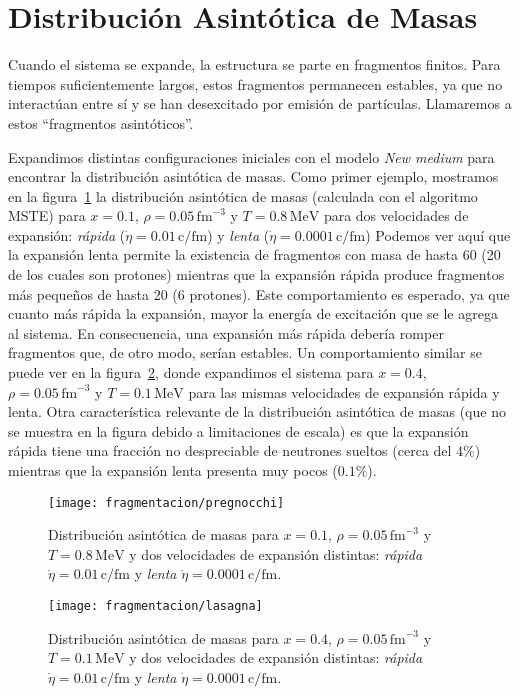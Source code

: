 \section{Distribución Asintótica de Masas}
Cuando el sistema se expande, la estructura se parte en fragmentos finitos.
Para tiempos suficientemente largos, estos fragmentos permanecen estables, ya que no interactúan entre sí y se han desexcitado por emisión de partículas.
Llamaremos a estos ``fragmentos asintóticos''.

Expandimos distintas configuraciones iniciales con el modelo \emph{New medium} para encontrar la distribución asintótica de masas.
Como primer ejemplo, mostramos en la figura~\ref{fig:asymp_preg} la distribución asintótica de masas (calculada con el algoritmo MSTE) para $x = 0.1$, $\rho = 0.05\,\text{fm}^{-3}$ y $T = 0.8\,\text{MeV}$ para dos velocidades de expansión: \emph{rápida} ($\dot{\eta} = 0.01\,\text{c/fm}$) y \emph{lenta} ($\dot{\eta} = 0.0001\,\text{c/fm}$)
Podemos ver aquí que la expansión lenta permite la existencia de fragmentos con masa de hasta 60 (20 de los cuales son protones) mientras que la expansión rápida produce fragmentos más pequeños de hasta 20 (6 protones).
Este comportamiento es esperado, ya que cuanto más rápida la expansión, mayor la energía de excitación que se le agrega al sistema.
En consecuencia, una expansión más rápida debería romper fragmentos que, de otro modo, serían estables.
Un comportamiento similar se puede ver en la figura~\ref{fig:asymp_las}, donde expandimos el sistema para $x = 0.4$, $\rho = 0.05\,\text{fm}^{-3}$ y $T = 0.1\,\text{MeV}$ para las mismas velocidades de expansión rápida y lenta.
Otra característica relevante de la distribución asintótica de masas (que no se muestra en la figura debido a limitaciones de escala) es que la expansión rápida tiene una fracción no despreciable de neutrones sueltos (cerca del $4\%$) mientras que la expansión lenta presenta muy pocos ($0.1\%$).

\begin{figure}[h]
  \centering
  \texttt{[image: fragmentacion/pregnocchi]}
  \caption{Distribución asintótica de masas para $x = 0.1$, $\rho = 0.05\,\text{fm}^{-3}$ y $T = 0.8\,\text{MeV}$ y dos velocidades de expansión distintas: \emph{rápida} $\dot{\eta} = 0.01\,\text{c/fm}$ y \emph{lenta} $\dot{\eta} = 0.0001\,\text{c/fm}$.}
\label{fig:asymp_preg}
\end{figure}

\begin{figure}[h]
  \centering
  \texttt{[image: fragmentacion/lasagna]}
  \caption{Distribución asintótica de masas para $x = 0.4$, $\rho = 0.05\,\text{fm}^{-3}$ y $T = 0.1\,\text{MeV}$ y dos velocidades de expansión distintas: \emph{rápida} $\dot{\eta} = 0.01\,\text{c/fm}$ y \emph{lenta} $\dot{\eta} = 0.0001\,\text{c/fm}$.}
\label{fig:asymp_las}
\end{figure}


